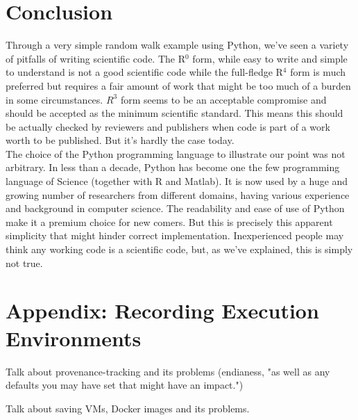 \documentclass[a4paper,11pt]{article}
\begin{document}
\section*{Conclusion}

Through a very simple random walk example using Python, we've seen a variety of pitfalls of writing scientific code. The R$^0$ form, while easy to write and simple to understand is not a good scientific code while the full-fledge R$^{4}$ form is much preferred but requires a fair amount of work that might be too much of a burden in some circumstances. $R^3$ form seems to be an acceptable compromise and should be accepted as the minimum scientific standard. This means this should be actually checked by reviewers and publishers when code is part of a work worth to be published. But it's hardly the case today.\\

The choice of the Python programming language to illustrate our point was not arbitrary. In less than a decade, Python has become one the few programming language of Science (together with R and Matlab). It is now used by a huge and growing number of researchers from different domains, having various experience and background in computer science. The readability and ease of use of Python make it a premium choice for new comers. But this is precisely this apparent simplicity that might hinder correct implementation. Inexperienced people may think any working code is a scientific code, but, as we've explained, this is simply not true.




\renewcommand*{\bibfont}{\small}
\printbibliography[title=References]

\newpage 
\appendix

\section{Appendix: Recording Execution Environments}
\label{appendix:executionenvs}
Talk about provenance-tracking and its problems (endianess, "as well as any defaults you may have set that might have an impact.")

Talk about saving VMs, Docker images and its problems.
\end{document}
